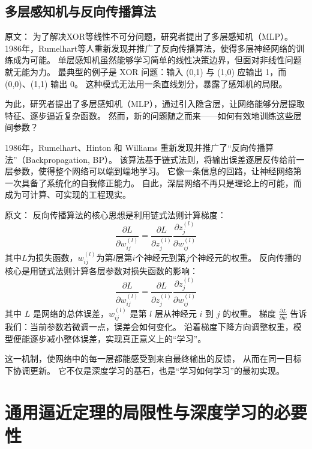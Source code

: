 \subsection{多层感知机与反向传播算法}

原文：
为了解决XOR等线性不可分问题，研究者提出了多层感知机（MLP）。1986年，Rumelhart等人重新发现并推广了反向传播算法，使得多层神经网络的训练成为可能。
单层感知机虽然能够学习简单的线性决策边界，但面对非线性问题就无能为力。  
最典型的例子是 XOR 问题：输入 (0,1) 与 (1,0) 应输出 1，而 (0,0)、(1,1) 输出 0。  
这种模式无法用一条直线划分，暴露了感知机的局限。  

为此，研究者提出了多层感知机（MLP），通过引入隐含层，让网络能够分层提取特征、逐步逼近复杂函数。  
然而，新的问题随之而来——如何有效地训练这些层间参数？  

1986年，Rumelhart、Hinton 和 Williams 重新发现并推广了“反向传播算法”（Backpropagation, BP）。  
该算法基于链式法则，将输出误差逐层反传给前一层参数，使得整个网络可以端到端地学习。  
它像一条信息的回路，让神经网络第一次具备了系统化的自我修正能力。  
自此，深层网络不再只是理论上的可能，而成为可计算、可实现的工程现实。

原文：
反向传播算法的核心思想是利用链式法则计算梯度：
\begin{equation}
\frac{\partial L}{\partial w_{ij}^{(l)}} = \frac{\partial L}{\partial z_j^{(l)}} \frac{\partial z_j^{(l)}}{\partial w_{ij}^{(l)}}
\end{equation}
其中$L$为损失函数，$w_{ij}^{(l)}$为第$l$层第$i$个神经元到第$j$个神经元的权重。
反向传播的核心是用链式法则计算各层参数对损失函数的影响：  
\begin{equation}
\frac{\partial L}{\partial w_{ij}^{(l)}} = \frac{\partial L}{\partial z_j^{(l)}} \frac{\partial z_j^{(l)}}{\partial w_{ij}^{(l)}}
\end{equation}
其中 $L$ 是网络的总体误差，$w_{ij}^{(l)}$ 是第 $l$ 层从神经元 $i$ 到 $j$ 的权重。  
梯度 $\frac{\partial L}{\partial w}$ 告诉我们：当前参数若微调一点，误差会如何变化。  
沿着梯度下降方向调整权重，模型便能逐步减小整体误差，实现真正意义上的“学习”。  

这一机制，使网络中的每一层都能感受到来自最终输出的反馈，  
从而在同一目标下协调更新。  
它不仅是深度学习的基石，也是“学习如何学习”的最初实现。


\section{通用逼近定理的局限性与深度学习的必要性}

